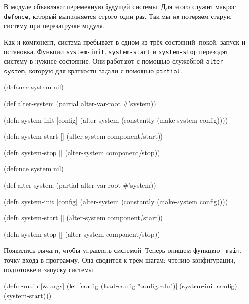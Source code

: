 В модуле объявляют переменную будущей системы. Для этого служит макрос
\verb|defonce|, который выполняется строго один раз. Так мы не потеряем старую
систему при перезагрузке модуля.

Как и компонент, система пребывает в одном из трёх состояний: покой, запуск и
остановка. Функции \verb|system-init|, \verb|system-start| и \verb|system-stop|
переводят систему в нужное состояние. Они работают с помощью служебной
\verb|alter-system|, которую для краткости задали с помощью \verb|partial|.


\ifnarrow

\begin{english}
  \begin{clojure}
(defonce system nil)

(def alter-system
  (partial alter-var-root #'system))

(defn system-init [config]
  (alter-system
    (constantly (make-system config))))

(defn system-start []
  (alter-system component/start))

(defn system-stop []
  (alter-system component/stop))
  \end{clojure}
\end{english}

\else

\begin{english}
  \begin{clojure}
(defonce system nil)

(def alter-system (partial alter-var-root #'system))

(defn system-init [config]
  (alter-system (constantly (make-system config))))

(defn system-start []
  (alter-system component/start))

(defn system-stop []
  (alter-system component/stop))
  \end{clojure}
\end{english}

\fi


Появились рычаги, чтобы управлять системой. Теперь опишем функцию \verb|-main|,
точку входа в программу. Она сводится к трём шагам: чтению конфигурации,
подготовке и запуску системы.

\ifnarrow

\begin{english}
  \begin{clojure}
(defn -main [& args]
  (let [config
        (load-config "config.edn")]
    (system-init config)
    (system-start)))
  \end{clojure}
\end{english}

